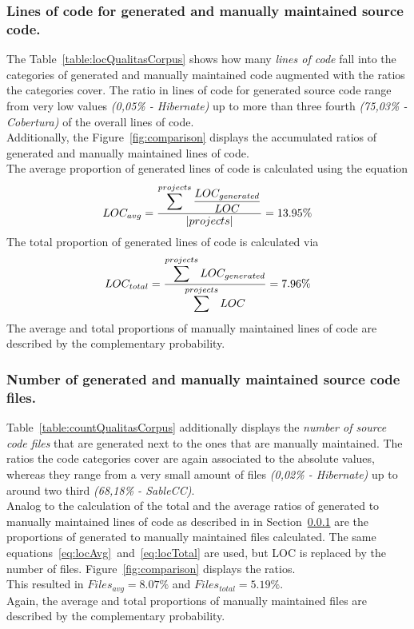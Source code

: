 \subsubsection{Lines of code for generated and manually maintained source code.}
\label{section:qualitasCorpusLOC}
The Table~\ref{table:locQualitasCorpus} shows how many \textit{lines of code} fall into the categories of generated and manually maintained code augmented with the ratios the categories cover. The ratio in lines of code for generated source code range from very low values \textit{(0,05\% - Hibernate)} up to more than three fourth \textit{(75,03\% - Cobertura)} of the overall lines of code.\\
Additionally, the Figure~\ref{fig:comparison} displays the accumulated ratios of generated and manually maintained lines of code.\\
The average proportion of generated lines of code is calculated using the equation
\begin{equation}
	\label{eq:locAvg}
	LOC_{avg} = \frac{\mathlarger{\sum^{projects} \frac{LOC_{generated}}{LOC}}}{|projects|} = 13.95\%
\end{equation}
The total proportion of generated lines of code is calculated via
\begin{equation}
	\label{eq:locTotal}
	LOC_{total} = \frac{\mathlarger{\sum^{projects} LOC_{generated}}}{\mathlarger{\sum^{projects} LOC}} = 7.96\%
\end{equation} 
The average and total proportions of manually maintained lines of code are described by the complementary probability.



\subsubsection{Number of generated and manually maintained source code files.}
Table~\ref{table:countQualitasCorpus} additionally displays the \textit{number of source code files} that are generated next to the ones that are manually maintained. The ratios the code categories cover are again associated to the absolute values, whereas they range from a very small amount of files \textit{(0,02\% - Hibernate)} up to around two third \textit{(68,18\% - SableCC)}.\\
Analog to the calculation of the total and the average ratios of generated to manually maintained lines of code as described in in Section~\ref{section:qualitasCorpusLOC} are the proportions of generated to manually maintained files calculated. The same equations~\ref{eq:locAvg}~and~\ref{eq:locTotal} are used, but LOC is replaced by the number of files. Figure~\ref{fig:comparison} displays the ratios.\\
This resulted in $Files_{avg} = 8.07\%$ and $Files_{total} = 5.19\%$.\\
Again, the average and total proportions of manually maintained files are described by the complementary probability.

